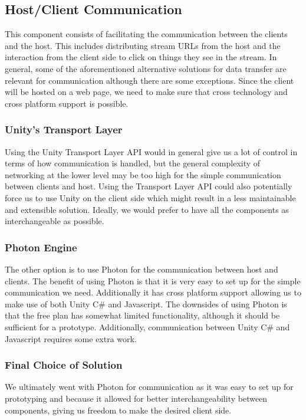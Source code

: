 \subsection{Host/Client Communication} %
This component consists of facilitating the communication between the clients and the host. This includes distributing stream URLs from the host and the interaction from the client side to click on things they see in the stream. In general, some of the aforementioned alternative solutions for data transfer are relevant for communication although there are some exceptions. Since the client will be hosted on a web page, we need to make sure that cross technology and cross platform support is possible. 
    
\subsubsection{Unity's Transport Layer}
Using the Unity Transport Layer API would in general give us a lot of control in terms of how communication is handled, but the general complexity of networking at the lower level may be too high for the simple communication between clients and host. Using the Transport Layer API could also potentially force us to use Unity on the client side which might result in a less maintainable and extensible solution. Ideally, we would prefer to have all the components as interchangeable as possible. 
      
\subsubsection{Photon Engine}
The other option is to use Photon for the communication between host and clients. The benefit of using Photon is that it is very easy to set up for the simple communication we need. Additionally it has cross platform support allowing us to make use of both Unity C\# and Javascript. The downsides of using Photon is that the free plan has somewhat limited functionality, although it should be sufficient for a prototype. Additionally, communication between Unity C\# and Javascript requires some extra work\cite{photon_javascript}.

\subsubsection{Final Choice of Solution}
We ultimately went with Photon for communication as it was easy to set up for prototyping and because it allowed for better interchangeability between components, giving us freedom to make the desired client side.

